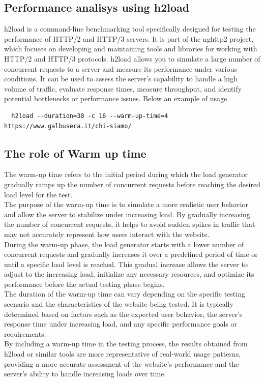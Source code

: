 \documentclass[eng]{class}
\begin{document}
\subsection{Performance analisys using h2load}

h2load is a command-line benchmarking tool specifically designed for testing the performance of HTTP/2 and HTTP/3 servers.
It is part of the nghttp2 project, which focuses on developing and maintaining tools and libraries for working with HTTP/2 and HTTP/3 protocols.
h2load allows you to simulate a large number of concurrent requests to a server and measure its performance under various conditions.
It can be used to assess the server's capability to handle a high volume of traffic, evaluate response times, measure throughput,
and identify potential bottlenecks or performance issues.
Below an example of usage.
\begin{lstlisting}
  h2load --duration=30 -c 16 --warm-up-time=4  https://www.galbusera.it/chi-siamo/
\end{lstlisting}

\subsection{The role of Warm up time}
The warm-up time refers to the initial period during which the load generator gradually ramps up
the number of concurrent requests before reaching the desired load level for the test.\\
The purpose of the warm-up time is to simulate a more realistic user behavior and allow the server to stabilize under increasing load.
By gradually increasing the number of concurrent requests, it helps to avoid sudden spikes in traffic that may not accurately represent
how users interact with the website.\\
During the warm-up phase, the load generator starts with a lower number of concurrent requests and gradually
increases it over a predefined period of time or until a specific load level is reached.
This gradual increase allows the server to adjust to the increasing load, initialize any necessary resources,
and optimize its performance before the actual testing phase begins.\\
The duration of the warm-up time can vary depending on the specific testing scenario and the characteristics of the website being tested.
It is typically determined based on factors such as the expected user behavior,
the server's response time under increasing load, and any specific performance goals or requirements.\\
By including a warm-up time in the testing process, the results obtained from h2load or similar tools are more representative of real-world usage patterns,
providing a more accurate assessment of the website's performance and the server's ability to handle increasing loads over time.
\end{document}
